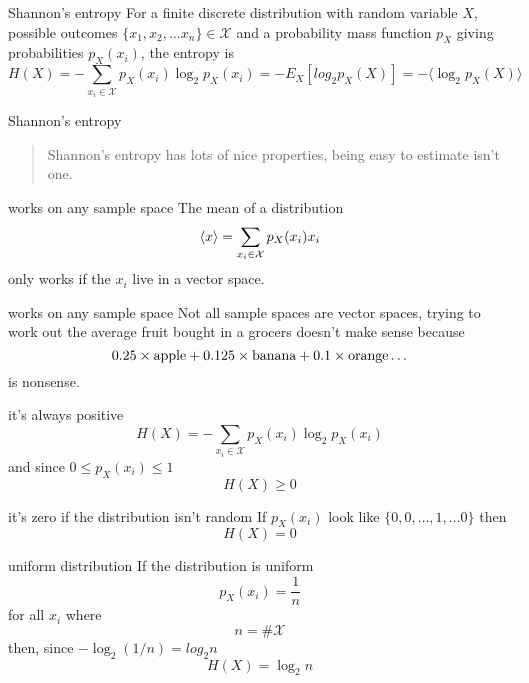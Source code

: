 \documentclass{beamer}
\newcommand{\crish}{\color{reddish}}
\newcommand{\cbla}{\color{black}}
\newcommand{\cblu}{\color{blue}}
\newcommand{\sm}{\color{reddish}$}
\newcommand{\fm}{$\color{black}{}}
\begin{document}
\begin{frame}{Shannon's entropy}
  For a finite discrete distribution with random variable \sm X\fm,
  possible outcomes \sm\{x_1,x_2,\ldots x_n\}\in\mathcal{X}\fm{} and a
  probability mass function \sm p_X\fm{} giving probabilities \sm p_X(x_i)\fm, the
  entropy is
\crish
  $$
H(X)=-\sum_{x_i\in \mathcal{X}}{p_X(x_i)\log_2p_X(x_i)}=-E_X[log_2{p_X(X)}]=-\langle \log_2{p_X(X)}\rangle
  $$
\cbla
\end{frame}

\begin{frame}{Shannon's entropy}
  \begin{quote}
    Shannon's entropy has lots of nice properties, being easy to estimate isn't one.
  \end{quote}
\end{frame}

\begin{frame}{works on any sample space}
The mean of a distribution
\crish
$$
\langle x\rangle = \sum_{x_i\in \mathcal{X}}{p_X(x_i)\cblu{}x_i\crish{}}
$$
\cbla
only works if the \cblu $x_i$\cbla{} live in a vector space. 
  \end{frame}


\begin{frame}{works on any sample space}
Not all sample spaces are vector spaces, trying to work out the average fruit bought in a grocers doesn't make sense because
\crish
$$
0.25\times \mbox{\color{green}apple\crish}+0.125\times \mbox{\color{yellow}banana\crish}+0.1\times \mbox{\color{orange}orange\crish}\ldots
$$ \cbla is nonsense.
  \end{frame}


\begin{frame}{it's always positive}
\crish
  $$
H(X)=-\sum_{x_i\in \mathcal{X}}{p_X(x_i)\log_2p_X(x_i)}
$$
\cbla
 and since \sm 0\le p_X(x_i)\le 1 \fm 
 \crish
 $$
 H(X)\ge 0
 $$
 \cbla
\end{frame}

\begin{frame}{it's zero if the distribution isn't random}
  If \sm p_X(x_i)\fm{} look like \sm\{0,0,\dots,1,\ldots 0\}\fm{} then
\crish
 $$
 H(X)= 0
 $$
 \cbla
\end{frame}

\begin{frame}{uniform distribution}
  If the distribution is uniform
  \crish
  $$
  p_X(x_i)=\frac{1}{n}
$$
  \cbla
  for all \sm x_i\fm{} where
    \crish
  $$
  n=\#\mathcal{X}
$$
  \cbla
then, since \sm-\log_2(1/n)=log_2{n}\fm{}  
 \crish
 $$
 H(X)=\log_2{n}
 $$
 \cbla
\end{frame}
\end{document}
